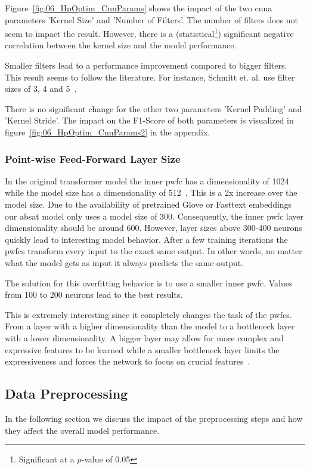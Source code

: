 Figure~\ref{fig:06_HpOptim_CnnParams} shows the impact of the two \gls{cnna} parameters 'Kernel Size' and 'Number of Filters'. The number of filters does not seem to impact the result. However, there is a {(statistical\footnote{Significant at a $p$-value of 0.05})} significant negative correlation between the kernel size and the model performance. 

Smaller filters lead to a performance improvement compared to bigger filters. This result seems to follow the literature. For instance, Schmitt et. al. use filter sizes of 3, 4 and 5~\cite{Schmitt2018}.
\medskip

There is no significant change for the other two parameters 'Kernel Padding' and 'Kernel Stride'. The impact on the F1-Score of both parameters is visualized in figure~\ref{fig:06_HpOptim_CnnParams2} in the appendix.

\subsubsection{Point-wise Feed-Forward Layer Size}

In the original transformer model the inner \acrfull{pwfc} has a dimensionality of 1024 while the model size has a dimensionality of 512~\cite{Vaswani2017c}. This is a 2x increase over the model size. Due to the availability of pretrained Glove or Fasttext embeddings our \gls{absat} model only uses a model size of 300. Consequently, the inner \gls{pwfc} layer dimensionality should be around 600. However, layer sizes above 300-400 neurons quickly lead to interesting model behavior. After a few training iterations the \glspl{pwfc} transform every input to the exact same output. In other words, no matter what the model gets as input it always predicts the same output.
\medskip

The solution for this overfitting behavior is to use a smaller inner \gls{pwfc}. Values from 100 to 200 neurons lead to the best results.

This is extremely interesting since it completely changes the task of the \glspl{pwfc}. From a layer with a higher dimensionality than the model to a bottleneck layer with a lower dimensionality. A bigger layer may allow for more complex and expressive features to be learned while a smaller bottleneck layer limits the expressiveness and forces the network to focus on crucial features~\cite{Ramsundar2015}.

\subsection{Data Preprocessing}
\label{subsec:06_dataPreprocessing}
In the following section we discuss the impact of the preprocessing steps and how they affect the overall model performance. 

